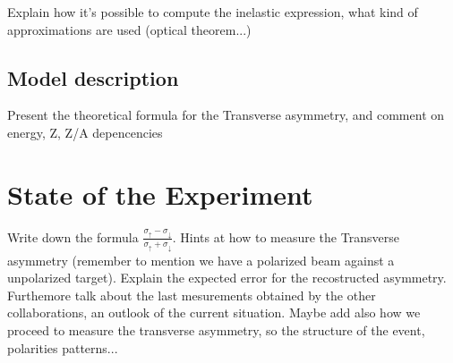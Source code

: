 Explain how it's possible to compute the inelastic expression, what kind of approximations are used (optical theorem...) 

\subsection{Model description}
Present the theoretical formula for the Transverse asymmetry, and comment on energy, Z, Z/A depencencies

\section{State of the Experiment}

Write down the formula $\frac{\sigma_{\uparrow} - \sigma_{\downarrow}}{\sigma_{\uparrow} + \sigma_{\downarrow}}$. Hints at how to measure the Transverse asymmetry (remember to mention we have a polarized beam against a unpolarized target). Explain the expected error for the recostructed asymmetry. Furthemore talk about the last mesurements obtained by the other collaborations, an outlook of the current situation. Maybe add also how we proceed to measure the transverse asymmetry, so the structure of the event, polarities patterns...



